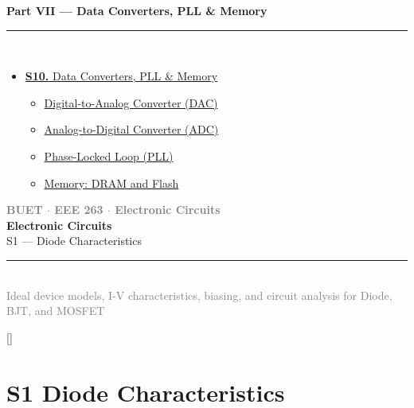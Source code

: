 \documentclass[12pt]{article}
\newcommand{\secdivider}[3]{%
  \newpage\thispagestyle{empty}%
  \vspace*{\fill}%
  \begin{tcolorbox}[enhanced,colback=#3!6,colframe=#3,boxrule=1.5pt,arc=8pt,
    left=20pt,right=20pt,top=22pt,bottom=22pt,
    shadow={3pt}{-3pt}{0pt}{black!15}]
    \centering
    {\large\textcolor{gray}{\textbf{BUET $\cdot$ EEE 263 $\cdot$ Electronic Circuits}}}\\[8pt]
    {\fontsize{26}{32}\selectfont\bfseries\textcolor{#3}{Electronic Circuits}}\\[6pt]
    {\fontsize{15}{19}\selectfont\textcolor{dgray}{#1}}\\[12pt]
    \textcolor{#3!60}{\rule{0.5\textwidth}{0.5pt}}\\[6pt]
    {\small\textcolor{gray}{#2}}
  \end{tcolorbox}%
  \vspace*{\fill}\newpage%
}
\begin{document}
\begin{tcolorbox}[breakable,colback=cG!5,colframe=cG,boxrule=1pt,arc=5pt,
  left=8pt,right=8pt,top=8pt,bottom=8pt,before skip=4pt]
  {\large\bfseries\textcolor{cG}{Part VII --- Data Converters, PLL \& Memory}}\\[5pt]
  \textcolor{cG!40}{\rule{\textwidth}{0.4pt}}\\[3pt]
  \small\begin{itemize}[leftmargin=1.2em,itemsep=1pt,label={\textcolor{cG}{$\triangleright$}}]
    \item \hyperref[sec:S10]{\textbf{S10.} Data Converters, PLL \& Memory}
      \begin{itemize}[leftmargin=1.5em,itemsep=0pt,label={\textcolor{cG}{$\cdot$}}]
        \item \hyperref[sub:s10-dac]{Digital-to-Analog Converter (DAC)}
        \item \hyperref[sub:s10-adc]{Analog-to-Digital Converter (ADC)}
        \item \hyperref[sub:s10-pll]{Phase-Locked Loop (PLL)}
        \item \hyperref[sub:s10-memory]{Memory: DRAM and Flash}
      \end{itemize}
  \end{itemize}
\end{tcolorbox}

\newpage


\secdivider{S1 --- Diode Characteristics}{Ideal device models, I-V characteristics, biasing, and circuit analysis for Diode, BJT, and MOSFET}{cA}

 
\label{sec:S1}
\titleformat{\section}{\large\bfseries\color{cA}}{}{0em}{}[\titlerule]
\section{S1 \quad Diode Characteristics}
\end{document}

